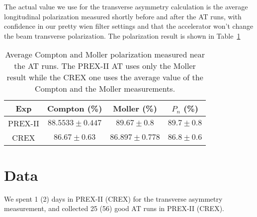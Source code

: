 The actual value we use for the transverse asymmetry calculation is the 
average longitudinal polarization measured shortly before and after the AT runs, 
with confidence in our pretty wien filter settings and that the accelerator 
won't change the beam transverse polarization. 
The polarization result is shown in Table~\ref{tab:AT_polarization}
\begin{table}[!h]
    \centering
    \begin{tabular}{c | c c c}
    \hline
    Exp	& Compton (\%)	& Moller (\%)	& $P_n$ (\%) \\
    \hline
    PREX-II & $88.5533 \pm 0.447$   & $89.67 \pm 0.8$	& $89.7 \pm 0.8$  \\
    CREX    & $86.67 \pm 0.63$	& $86.897 \pm 0.778$	& $86.8 \pm 0.6$  \\
    \hline
    \end{tabular}
    \caption[AT Polarization]
    {Average Compton and Moller polarization measured near the AT runs. 
    The PREX-II AT uses only the Moller result while the CREX one uses the average value of the 
    Compton and the Moller measurements.}
    \label{tab:AT_polarization}
\end{table}

\section{Data}

We spent 1 (2) days in PREX-II (CREX) for the transverse asymmetry measurement,
and collected 25 (56) good AT runs in PREX-II (CREX).

